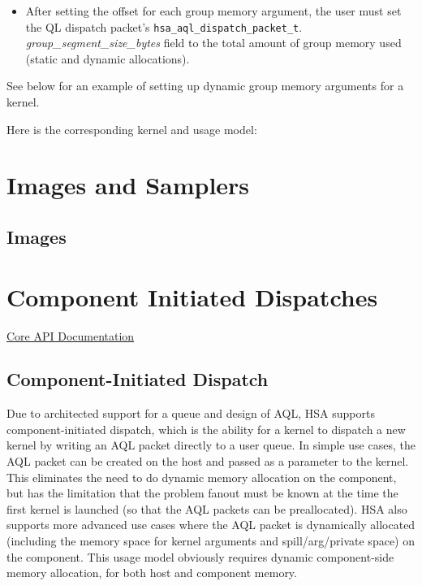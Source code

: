 \documentclass{book}
\begin{document}
\begin{appendices}
\begin{itemize}
\item After setting the offset for each group memory argument, the
user must set the \-Q\-L dispatch packet's
\texttt{hsa\_aql\_dispatch\_packet\_t}.{\itshape
group\_segment\_size\_bytes} field to the total amount of group
memory used (static and dynamic allocations).

\end{itemize}

See below for an example of setting up dynamic group memory
arguments for a kernel.
\begin{framed}

\end{framed}

Here is the corresponding kernel and usage model\-:

\begin{framed}

\end{framed}


\chapter{Images and Samplers}
\label{images} \hypertarget{images}{}
\hypertarget{Images}{}\section{Images} \label{images}

\chapter{Component Initiated Dispatches} \label{architected}
\hypertarget{architectedchptr}{}
\hyperlink{coreapi}{Core A\-P\-I
Documentation}\hypertarget{coreapi_dtde}{}\section{Component-\/\-Initiated
Dispatch}\label{coreapi_dtde}

Due to architected support for a queue and design of A\-Q\-L,
H\-S\-A supports component-\/initiated dispatch, which is the ability
for a kernel to dispatch a new kernel by writing an A\-Q\-L packet
directly to a user queue. In simple use cases, the A\-Q\-L packet
can be created on the host and passed as a parameter to the kernel.
This eliminates the need to do dynamic memory allocation on the
component, but has the limitation that the problem fanout must be known
at the time the first kernel is launched (so that the A\-Q\-L
packets can be preallocated). H\-S\-A also supports more advanced
use cases where the A\-Q\-L packet is dynamically allocated
(including the memory space for kernel arguments and
spill/arg/private space) on the component. This usage model obviously
requires dynamic component-\/side memory allocation, for both host and
component memory.


\end{appendices}
\end{document}
